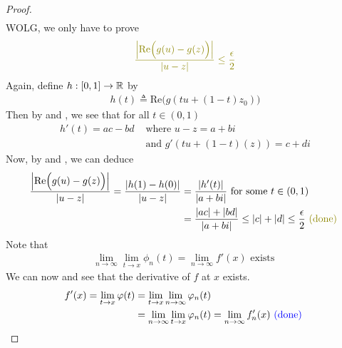 \documentclass{report}
\begin{document}
\begin{proof}
\begin{align*}
\end{align*}
WOLG, we only have to prove 
\begin{align*}
\olive{\frac{\abso{\text{Re}\Big(g(u)-g(z) \Big)}}{\abso{u-z}}\leq \frac{\epsilon}{2}}
\end{align*}
Again, define $h:[0,1]\rightarrow \mathbb{R}$ by 
\begin{align*}
h(t)\triangleq \text{Re}\Big(g(tu+(1-t)z_0) \Big)
\end{align*}
Then by  and , we see that for all $t\in (0,1)$ 
\begin{align*}
  h'(t)= ac-bd&\text{ where }u-z=a+b i \\
&\text{ and } g'(tu+(1-t)(z))=c+di
\end{align*}
Now, by  and , we can deduce 
\begin{align*}
  \frac{\abso{\text{Re}\Big(g(u)-g(z) \Big)}}{\abso{u-z}}=\frac{\abso{h(1)-h(0)}}{\abso{u-z}}&=\frac{\abso{h'(t)}}{\abso{a+b i}}\text{ for some }t \in (0,1)\\
&= \frac{\abso{ac}+\abso{bd}}{\abso{a+b i}}\leq \abso{c}+\abso{d}\leq \frac{\epsilon}{2} \odone
\end{align*}
Note that 
\begin{align*}
\lim_{n\to \infty}\lim_{t\to x}\phi_n(t)=\lim_{n\to \infty}f'(x)\text{ exists }
\end{align*}
We can now  and see that the derivative of $f$ at $x$ exists. 
\begin{align*}
f'(x)=\lim_{t\to x}\varphi (t)&=\lim_{t\to x}\lim_{n\to \infty}\varphi_n(t)\\
&=\lim_{n\to \infty}\lim_{t\to x}\varphi_n(t)=\lim_{n\to \infty}f'_n(x) \textcolor{blue}{\text{ (done) }}
\end{align*}
\end{proof}
\end{document}
